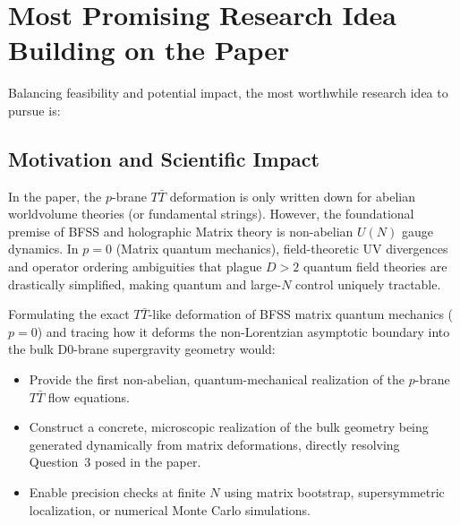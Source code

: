 \documentclass[11pt,a4paper]{article}
\begin{document}
\section{Most Promising Research Idea Building on the Paper}

Balancing feasibility and potential impact, the most worthwhile research idea to pursue is:

\vspace{0.5em}
\noindent{}
\vspace{0.5em}

\subsection*{Motivation and Scientific Impact}
In the paper, the $p$-brane $T\bar{T}$ deformation is only written down for abelian worldvolume theories (or fundamental strings). However, the foundational premise of BFSS and holographic Matrix theory is non-abelian $U(N)$ gauge dynamics. In $p=0$ (Matrix quantum mechanics), field-theoretic UV divergences and operator ordering ambiguities that plague $D > 2$ quantum field theories are drastically simplified, making quantum and large-$N$ control uniquely tractable. 

Formulating the exact $T\bar{T}$-like deformation of BFSS matrix quantum mechanics ($p=0$) and tracing how it deforms the non-Lorentzian asymptotic boundary into the bulk D0-brane supergravity geometry would:
\begin{itemize}
    \item Provide the first non-abelian, quantum-mechanical realization of the $p$-brane $T\bar{T}$ flow equations.
    \item Construct a concrete, microscopic realization of the bulk geometry being generated dynamically from matrix deformations, directly resolving Question~3 posed in the paper.
    \item Enable precision checks at finite $N$ using matrix bootstrap, supersymmetric localization, or numerical Monte Carlo simulations.
\end{itemize}
\end{document}
